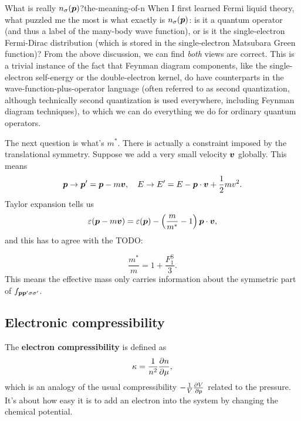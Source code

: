 \documentclass[hyperref, a4paper]{article}
\newcommand*{\concept}[1]{{\textbf{#1}}}
\begin{document}
\begin{theorybox}{What is really $n_{\sigma}(\vb*{p})$?}{the-meaning-of-n}
    When I first learned Fermi liquid theory, 
    what puzzled me the most is 
    what exactly is $n_{\sigma}(\vb*{p})$:
    is it a quantum operator
    (and thus a label of the many-body wave function), 
    or is it the single-electron Fermi-Dirac distribution
    (which is stored in the single-electron Matsubara Green function)?
    From the above discussion, 
    we can find \emph{both} views are correct.
    This is a trivial instance of the fact that 
    Feynman diagram components, like the single-electron self-energy 
    or the double-electron kernel, 
    do have counterparts in the wave-function-plus-operator language
    (often referred to as second quantization, 
    although technically second quantization is used everywhere, 
    including Feynman diagram techniques),
    to which we can do everything we do for ordinary quantum operators.
\end{theorybox}

The next question is what's $m^*$.
There is actually a constraint imposed by 
the translational symmetry. 
Suppose we add a very small velocity $\vb*{v}$ globally. 
This means 
\begin{equation}
    \vb*{p} \to \vb*{p}' = \vb*{p} - m \vb*{v}, \quad 
    E \to E' = E - \vb*{p} \cdot \vb*{v} + \frac{1}{2} m v^2.
\end{equation}
Taylor expansion tells us
\begin{equation}
    \varepsilon(\vb*{p} - m \vb*{v}) = 
    \varepsilon(\vb*{p}) - \left(
        \frac{m}{m^*} - 1
    \right) \vb*{p} \cdot \vb*{v}, 
\end{equation}
and this has to agree with the 
TODO: 

\begin{equation}
    \frac{m^*}{m} = 1 + \frac{F^{\text{S}}_1}{3}.
    \label{eq:fermi-liquid.effective-mass-interaction}
\end{equation}
This means the effective mass only carries information about 
the symmetric part of $f_{\vb*{p} \vb*{p}' \sigma \sigma'}$.

\subsection{Electronic compressibility} 

The \concept{electron compressibility} is defined as 
\begin{equation}
    \kappa = \frac{1}{n^2} \pdv{n}{\mu},
\end{equation}
which is an analogy of the usual compressibility 
$- \frac{1}{V} \pdv{V}{p}$
related to the pressure.
It's about how easy it is to 
add an electron into the system 
by changing the chemical potential.
\end{document}
